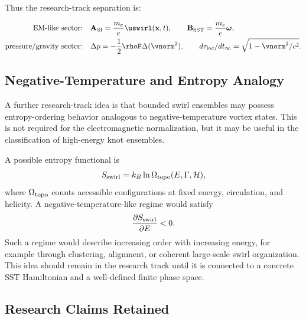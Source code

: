    Thus the research-track separation is:
    
    \begin{align}
        \text{EM-like sector:}
        \quad
        &\mathbf{A}_{\rm SI}
        =
        \frac{m_e}{e}\uswirl(\mathbf{x},t),
        \qquad
        \mathbf{B}_{\rm SST}
        =
        \frac{m_e}{e}\boldsymbol{\omega},
        \label{eq:em_sector_summary}
        \\
        \text{pressure/gravity sector:}
        \quad
        &\Delta p
        =
        -
        \frac{1}{2}\rhoF
        \Delta(\vnorm^2),
        \qquad
        d\tau_{\rm loc}/dt_\infty
        =
        \sqrt{1-\vnorm^2/c^2}.
        \label{eq:pressure_gravity_sector_summary}
    \end{align}

\subsection{Negative-Temperature and Entropy Analogy}
    
    A further research-track idea is that bounded swirl ensembles may possess
    entropy-ordering behavior analogous to negative-temperature vortex states.
    This is not required for the electromagnetic normalization, but it may be
    useful in the classification of high-energy knot ensembles.
    
    A possible entropy functional is
    \begin{equation}
        S_{\rm swirl}
        =
        k_B\ln\Omega_{\rm topo}(E,\Gamma,\mathcal{H}),
        \label{eq:swirl_entropy}
    \end{equation}
    where \(\Omega_{\rm topo}\) counts accessible configurations at fixed
    energy, circulation, and helicity.  A negative-temperature-like regime
    would satisfy
    \begin{equation}
        \frac{\partial S_{\rm swirl}}{\partial E}
        <
        0.
        \label{eq:negative_temperature_condition}
    \end{equation}
    Such a regime would describe increasing order with increasing energy,
    for example through clustering, alignment, or coherent large-scale swirl
    organization.  This idea should remain in the research track until it is
    connected to a concrete SST Hamiltonian and a well-defined finite phase
    space.

\subsection{Research Claims Retained}
    
